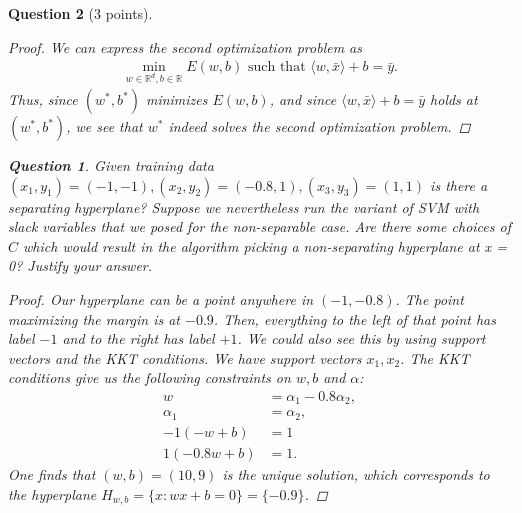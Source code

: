 \documentclass[12pt]{article}
\newcommand{\real}{\mathbb{R}}
\newcommand\set[1]{\{#1\}}
\newtheorem{question}{Question}
\begin{document}
\begin{question}[3 points]
\begin{proof}
    We can express the second optimization problem as
    \begin{align*}
      \min\limits_{w \in \real^d, b \in \real} E(w,b) \text{ such that } \langle w, \bar{x} \rangle + b = \bar{y}.
    \end{align*}
    Thus, since $(w^*, b^*)$ minimizes $E(w,b)$, and since $\langle w, \bar{x} \rangle + b = \bar{y}$ holds at $(w^*, b^*)$, we see that $w^*$ indeed solves the second optimization problem.
  \end{proof}
  \begin{question}
    Given training data $(x_1, y_1) = (-1, -1), (x_2, y_2) = (-0.8, 1), (x_3, y_3) = (1,1)$ is there a separating hyperplane? Suppose we nevertheless run the variant of SVM with slack variables that we posed for the non-separable case. Are there some choices of $C$ which would result in the algorithm picking a non-separating hyperplane at x = 0? Justify your answer.
    
  \end{question}
  \begin{proof}
    Our hyperplane can be a point anywhere in $(-1, -0.8)$. The point maximizing the margin is at $-0.9$. Then, everything to the left of that point has label $-1$ and to the right has label $+1$. We could also see this by using support vectors and the KKT conditions. We have support vectors $x_1, x_2$. The KKT conditions give us the following constraints on $w,b$ and $\alpha$:
    \begin{align*}
      w &= \alpha_1 - 0.8\alpha_2, \\
      \alpha_1 &= \alpha_2, \\
      -1(-w + b) &= 1 \\
      1(-0.8w + b) &= 1 .
    \end{align*}
    One finds that $(w,b)=(10,9)$ is the unique solution, which corresponds to the hyperplane $H_{w,b} = \set{x: wx+b = 0} = \set{-0.9}$. 
  \end{proof}
\end{question}
\end{document}
